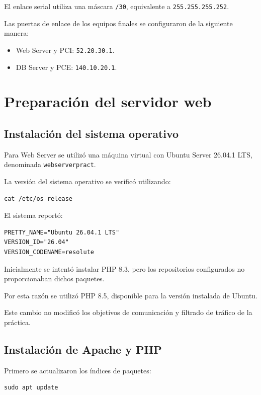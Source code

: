 \documentclass[12pt,a4paper]{article}
\begin{document}
El enlace serial utiliza una máscara
\texttt{/30}, equivalente a
\texttt{255.255.255.252}.

Las puertas de enlace de los equipos
finales se configuraron de la
siguiente manera:

\begin{itemize}
    \item Web Server y PCI:
    \texttt{52.20.30.1}.

    \item DB Server y PCE:
    \texttt{140.10.20.1}.
\end{itemize}

\section{Preparación del servidor web}

\subsection{Instalación del sistema operativo}

Para Web Server se utilizó una
máquina virtual con Ubuntu Server
26.04.1 LTS, denominada
\texttt{webserverpract}.

La versión del sistema operativo
se verificó utilizando:

\begin{lstlisting}
cat /etc/os-release
\end{lstlisting}

El sistema reportó:

\begin{lstlisting}
PRETTY_NAME="Ubuntu 26.04.1 LTS"
VERSION_ID="26.04"
VERSION_CODENAME=resolute
\end{lstlisting}

Inicialmente se intentó instalar PHP 8.3,
pero los repositorios configurados
no proporcionaban dichos paquetes.

Por esta razón se utilizó PHP 8.5,
disponible para la versión instalada
de Ubuntu.

Este cambio no modificó los objetivos
de comunicación y filtrado de tráfico
de la práctica.

\subsection{Instalación de Apache y PHP}

Primero se actualizaron los índices
de paquetes:

\begin{lstlisting}
sudo apt update
\end{lstlisting}
\end{document}
